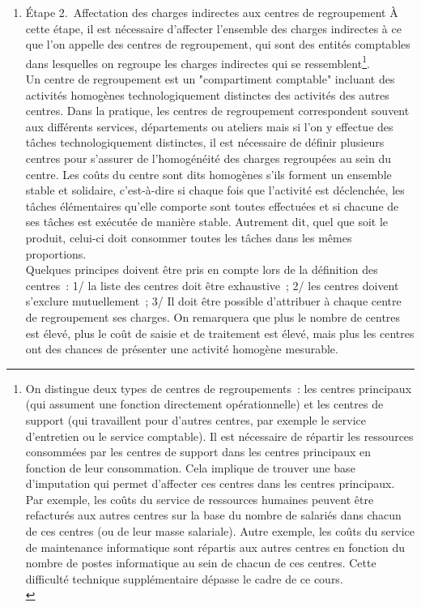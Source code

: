\documentclass{tufte-handout}
\begin{document}
\begin{enumerate}
\begin{enumerate}
\item Étape 2. Affectation des charges indirectes aux centres de regroupement
\label{sec:org81a2657}
À cette étape, il est nécessaire d'affecter l'ensemble des charges indirectes à ce que l'on appelle des centres de regroupement, qui sont des entités comptables dans lesquelles on regroupe les charges indirectes qui se ressemblent\footnote{On distingue deux types de centres de regroupements : les centres principaux (qui assument une fonction directement opérationnelle) et les centres de support (qui travaillent pour d'autres centres, par exemple le service d'entretien ou le service comptable). Il est nécessaire de répartir les ressources consommées par les centres de support dans les centres principaux en fonction de leur consommation. Cela implique de trouver une base d'imputation qui permet d'affecter ces centres dans les centres principaux. Par exemple, les coûts du service de ressources humaines peuvent être refacturés aux autres centres sur la base du nombre de salariés dans chacun de ces centres (ou de leur masse salariale). Autre exemple, les coûts du service de maintenance informatique sont répartis aux autres centres en fonction du nombre de postes informatique au sein de chacun de ces centres. Cette difficulté technique supplémentaire dépasse le cadre de ce cours.\\}.\\
Un centre de regroupement est un "compartiment comptable" incluant des activités homogènes technologiquement distinctes des activités des autres centres. Dans la pratique, les centres de regroupement correspondent souvent aux différents services, départements ou ateliers mais si l'on y effectue des tâches technologiquement distinctes, il est nécessaire de définir plusieurs centres pour s'assurer de l'homogénéité des charges regroupées au sein du centre. Les coûts du centre sont dits homogènes s'ils forment un ensemble stable et solidaire, c'est-à-dire si chaque fois que l'activité est déclenchée, les tâches élémentaires qu'elle comporte sont toutes effectuées et si chacune de ses tâches est exécutée de manière stable. Autrement dit, quel que soit le produit, celui-ci doit consommer toutes les tâches dans les mêmes proportions.\\
Quelques principes doivent être pris en compte lors de la définition des centres : 1/ la liste des centres doit être exhaustive ; 2/ les centres doivent s'exclure mutuellement ; 3/ Il doit être possible d'attribuer à chaque centre de regroupement ses charges. On remarquera que plus le nombre de centres est élevé, plus le coût de saisie et de traitement est élevé, mais plus les centres ont des chances de présenter une activité homogène mesurable.\\

\end{enumerate}
\end{enumerate}
\end{document}
